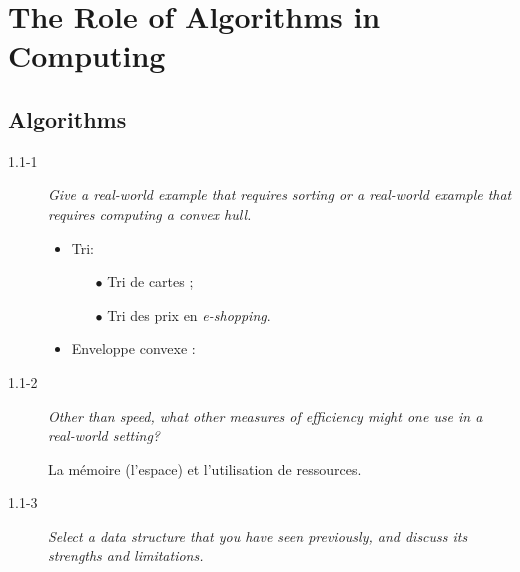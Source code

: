 \section{The Role of Algorithms in Computing}

\subsection{Algorithms}

\begin{description}
  \item[1.1-1] {\itshape Give a real-world example that requires sorting or a real-world example that requires computing a convex hull.}

    \begin{ex}
      \begin{itemize}
        \item Tri: 
          \begin{itemize}
            \item[$\bullet$] Tri de cartes ;
            \item[$\bullet$] Tri des prix en {\itshape e-shopping}.
          \end{itemize}
        \item Enveloppe convexe :  
      \end{itemize}
    \end{ex}

  \item[1.1-2] {\itshape Other than speed, what other measures of efficiency might one use in a real-world setting?}

    \begin{ex}
      La m\'emoire (l'espace) et l'utilisation de ressources.
    \end{ex}

  \item[1.1-3] {\itshape Select a data structure that you have seen previously, and discuss its strengths and limitations.}

    \begin{exrev}
      

\end{exrev}
\end{description}
